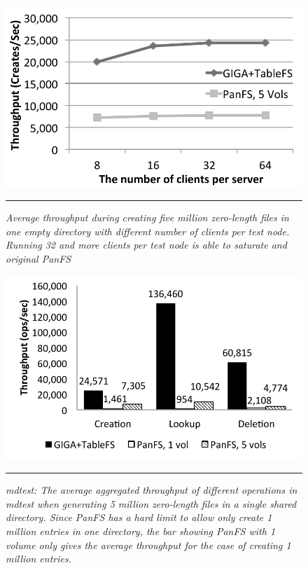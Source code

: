 \begin{figure}[t]  %
\centerline{\includegraphics[scale=0.7]{./figs/zero_file_creation_on_panfs}}
\vspace{10pt}
\caption{\normalsize
\textit{Average throughput during creating five million zero-length files
in one empty directory with different number of clients per test node.
Running 32 and more clients per test node is able to saturate \sys
and original PanFS}
}
\vspace{10pt}
\hrule
\label{graph:creation_clients}
\end{figure}       %

\begin{figure}[t]  %
\centerline{\includegraphics[scale=0.7]{./figs/mdtest}}
\vspace{10pt}
\caption{\normalsize
\textit{mdtest:
The average aggregated throughput of different operations in mdtest
when generating 5 million zero-length files in a single shared directory.
Since PanFS has a hard limit to allow only create 1 million entries
in one directory, the bar showing PanFS with 1 volume only gives
the average throughput for the case of creating 1 million entries.
}
}
\vspace{10pt}
\hrule
\label{graph:mdtest_ops}
\end{figure}       %


